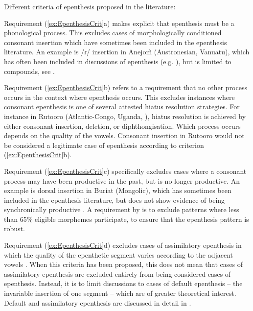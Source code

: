 \documentclass[output=paper]{langscibook}
\begin{document}
\begin{exe}
\ex Different criteria of epenthesis proposed in the literature:\label{ex:EpenthesisCrit}
	\begin{xlist}
	\end{xlist}
\end{exe}

Requirement (\ref{ex:EpenthesisCrit}a) makes explicit that epenthesis must be a phonological process. This excludes
cases of  morphologically conditioned consonant insertion  which have 
sometimes been included in the epenthesis literature. An example is /ɾ/ insertion
in Anejom̃  (Austronesian, Vanuatu), which has often been included
in discussions of epenthesis (e.g. \citealp{vasa17}),
but is limited to compounds, see \citet[186]{st14}. 

\largerpage
Requirement (\ref{ex:EpenthesisCrit}b) refers to a requirement that
no other process occurs in the context where epenthesis occurs.
This excludes instances where consonant epenthesis
is one of several attested hiatus resolution 
strategies. For instance in Rutooro (Atlantic-Congo, Uganda, \citealp{bi21}),
hiatus resolution is achieved by either consonant insertion,
deletion, or diphthongisation. 
Which  process occurs depends on the quality of the vowels.
Consonant insertion in Rutooro would not be considered
a legitimate case of epenthesis according 
to criterion (\ref{ex:EpenthesisCrit}b). 
								
Requirement (\ref{ex:EpenthesisCrit}c) specifically excludes cases
where a consonant process may have been
productive in the past, but is no longer productive.
An example is dorsal insertion in Buriat (Mongolic),
which has sometimes been included in the epenthesis literature,
but does not show evidence of being synchronically productive \citep{st20}.
A requirement by \citet{mo15} is to exclude patterns where less than
65\% eligible morphemes participate,
to ensure that the epenthesis pattern is robust. 

Requirement (\ref{ex:EpenthesisCrit}d) excludes cases of assimilatory epenthesis
in which the quality of the epenthetic
segment varies according to the adjacent vowels \citep[79]{dl06}.
When this criteria has been proposed, this does not   
mean that cases of assimilatory epenthesis are excluded
entirely from being considered cases of epenthesis.
Instead, it is to limit discussions to cases of  default epenthesis
-- the invariable insertion of one segment --
which are of greater theoretical interest.
Default and assimilatory epenthesis are discussed in detail
in . 
\end{document}

